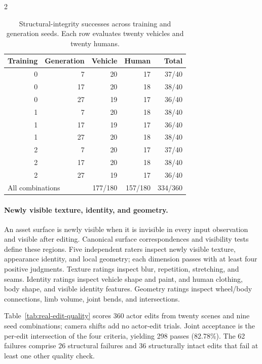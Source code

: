 \begin{multicols}{2}
\begin{table}[H]
\centering\small
\caption{Structural-integrity successes across training and generation seeds. Each row evaluates twenty vehicles and twenty humans.}
\label{tab:edit-seeds}
\begin{tabular}{@{}rrrrr@{}}
\toprule
Training & Generation & Vehicle & Human & Total \\
\midrule
0 & 7 & 20 & 17 & 37/40 \\
0 & 17 & 20 & 18 & 38/40 \\
0 & 27 & 19 & 17 & 36/40 \\
1 & 7 & 20 & 18 & 38/40 \\
1 & 17 & 19 & 17 & 36/40 \\
1 & 27 & 20 & 18 & 38/40 \\
2 & 7 & 20 & 17 & 37/40 \\
2 & 17 & 20 & 18 & 38/40 \\
2 & 27 & 19 & 17 & 36/40 \\
\midrule
\multicolumn{2}{l}{All combinations} & 177/180 & 157/180 & 334/360 \\
\bottomrule
\end{tabular}
\end{table}

\paragraph{Newly visible texture, identity, and geometry.}
An asset surface is newly visible when it is invisible in every input observation and visible after editing. Canonical surface correspondences and visibility tests define these regions. Five independent raters inspect newly visible texture, appearance identity, and local geometry; each dimension passes with at least four positive judgments. Texture ratings inspect blur, repetition, stretching, and seams. Identity ratings inspect vehicle shape and paint, and human clothing, body shape, and visible identity features. Geometry ratings inspect wheel/body connections, limb volume, joint bends, and intersections.

Table~\ref{tab:real-edit-quality} scores 360 actor edits from twenty scenes and nine seed combinations; camera shifts add no actor-edit trials. Joint acceptance is the per-edit intersection of the four criteria, yielding 298 passes (82.78\%). The 62 failures comprise 26 structural failures and 36 structurally intact edits that fail at least one other quality check.

\end{multicols}

